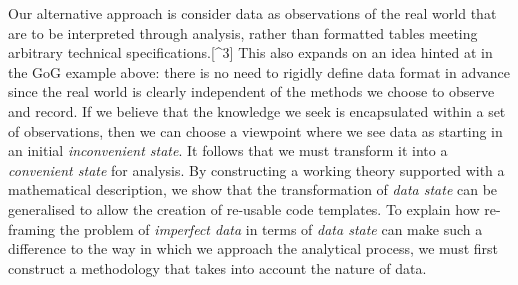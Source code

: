 \documentclass[smallextended]{svjour3}       %
\begin{document}
Our alternative approach is consider data as observations of the real
world that are to be interpreted through analysis, rather than formatted
tables meeting arbitrary technical specifications.{[}\^{}3{]} This also
expands on an idea hinted at in the GoG example above: there is no need
to rigidly define data format in advance since the real world is clearly
independent of the methods we choose to observe and record. If we
believe that the knowledge we seek is encapsulated within a set of
observations, then we can choose a viewpoint where we see data as
starting in an initial \emph{inconvenient state}. It follows that we
must transform it into a \emph{convenient state} for analysis. By
constructing a working theory supported with a mathematical description,
we show that the transformation of \emph{data state} can be generalised
to allow the creation of re-usable code templates. To explain how
re-framing the problem of \emph{imperfect data} in terms of \emph{data
state} can make such a difference to the way in which we approach the
analytical process, we must first construct a methodology that takes
into account the nature of data.
\end{document}
